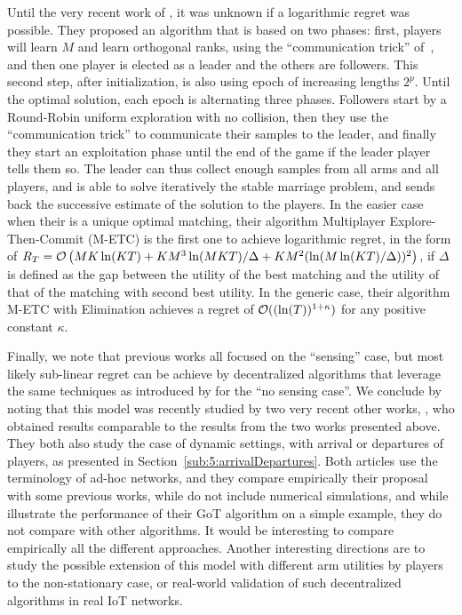 Until the very recent work of \cite{KaufmannAbbas19}, it was unknown if a logarithmic regret was possible.
They proposed an algorithm that is based on two phases: first, players will learn $M$ and learn orthogonal ranks, using the ``communication trick'' of~\cite{BoursierPerchet18}, and then one player is elected as a leader and the others are followers.
This second step, after initialization, is also using epoch of increasing lengths $2^p$.
Until the optimal solution, each epoch is alternating three phases.
Followers start by a Round-Robin uniform exploration with no collision, then they use the ``communication trick'' to communicate their samples to the leader, and finally they start an exploitation phase until the end of the game if the leader player tells them so.
The leader can thus collect enough samples from all arms and all players, and is able to solve iteratively the stable marriage problem, and sends back the successive estimate of the solution to the players.
%
In the easier case when their is a unique optimal matching, their algorithm Multiplayer Explore-Then-Commit (M-ETC) is the first one to achieve logarithmic regret, in the form of $R_T = \mathcal{O}\left( M K \ln(K T) + K M^3 \ln(M K T) / \Delta + K M^2 (\ln(M \ln(K T) / \Delta))^2 \right)$, if $\Delta$ is defined as the gap between the utility of the best matching and the utility of that of the matching with second best utility.
In the generic case, their algorithm M-ETC with Elimination achieves a regret of $\mathcal{O}((\ln(T))^{1+\kappa})$ for any positive constant $\kappa$.


Finally, we note that previous works all focused on the ``sensing'' case, but most likely sub-linear regret can be achieve by decentralized algorithms that leverage the same techniques as introduced by \cite{BoursierPerchet18,LugosiMehrabian18} for the ``no sensing case''.
%
We conclude by noting that this model was recently studied by two very recent other works, \cite{DarakHanawal18,Tibrewal2019}, who obtained results comparable to the results from the two works presented above.
They both also study the case of dynamic settings, with arrival or departures of players, as presented in Section~\ref{sub:5:arrivalDepartures}.
Both articles \cite{DarakHanawal18,Tibrewal2019} use the terminology of ad-hoc networks, and they compare empirically their proposal with some previous works, while \cite{KaufmannAbbas19} do not include numerical simulations, and while \cite{Bistritz18} illustrate the performance of their GoT algorithm on a simple example, they do not compare with other algorithms.
%
It would be interesting to compare empirically all the different approaches.
Another interesting directions are to study the possible extension of this model with different arm utilities by players to the non-stationary case, or real-world validation of such decentralized algorithms in real IoT networks.

